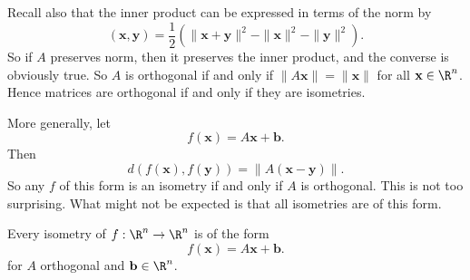 \documentclass[a4paper]{article}
\begin{document}
Recall also that the inner product can be expressed in terms of the norm by
\[
  (\mathbf{x}, \mathbf{y}) = \frac{1}{2}(\|\mathbf{x} + \mathbf{y}\|^2 - \|\mathbf{x}\|^2 -\|\mathbf{y}\|^2).
\]
So if $A$ preserves norm, then it preserves the inner product, and the converse is obviously true. So $A$ is orthogonal if and only if $\|A\mathbf{x}\| = \|\mathbf{x}\|$ for all $\mathbf{x} \in \R^n$. Hence matrices are orthogonal if and only if they are isometries.

More generally, let
\[
  f(\mathbf{x}) = A\mathbf{x} + \mathbf{b}.
\]
Then
\[
  d(f(\mathbf{x}), f(\mathbf{y})) = \|A(\mathbf{x} - \mathbf{y})\|.
\]
So any $f$ of this form is an isometry if and only if $A$ is orthogonal. This is not too surprising. What might not be expected is that all isometries are of this form.

\begin{thm}
  Every isometry of $f: \R^n \to \R^n$ is of the form
  \[
    f(\mathbf{x}) = A\mathbf{x} + \mathbf{b}.
  \]
  for $A$ orthogonal and $\mathbf{b} \in \R^n$.
\end{thm}
\end{document}
